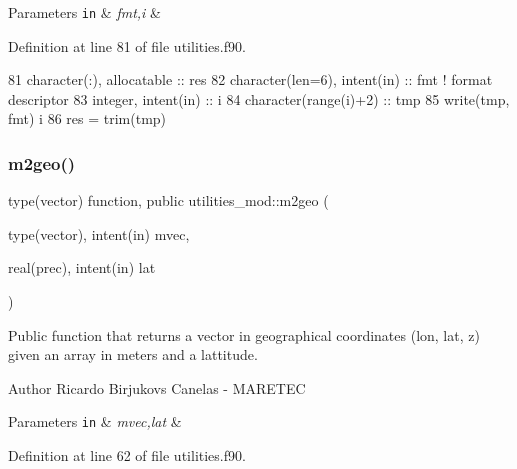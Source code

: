 \begin{DoxyParams}[1]{Parameters}
\mbox{\tt in}  & {\em fmt,i} & \\
\hline
\end{DoxyParams}


Definition at line 81 of file utilities.\+f90.


\begin{DoxyCode}
81     \textcolor{keywordtype}{character(:)}, \textcolor{keywordtype}{allocatable} :: res
82     \textcolor{keywordtype}{character(len=6)}, \textcolor{keywordtype}{intent(in)} :: fmt \textcolor{comment}{! format descriptor}
83     \textcolor{keywordtype}{integer}, \textcolor{keywordtype}{intent(in)} :: i
84     \textcolor{keywordtype}{character(range(i)+2)} :: tmp
85     \textcolor{keyword}{write}(tmp, fmt) i
86     res = trim(tmp)
\end{DoxyCode}
\mbox{\label{namespaceutilities__mod_ac4f9ec7e3dc3683a4e79e462d89a90b9}} 
\subsubsection{\texorpdfstring{m2geo()}{m2geo()}}
{\footnotesize\ttfamily type(vector) function, public utilities\+\_\+mod\+::m2geo (\begin{DoxyParamCaption}\item[{type(vector), intent(in)}]{mvec,  }\item[{real(prec), intent(in)}]{lat }\end{DoxyParamCaption})}



Public function that returns a vector in geographical coordinates (lon, lat, z) given an array in meters and a lattitude. 

\begin{DoxyAuthor}{Author}
Ricardo Birjukovs Canelas -\/ M\+A\+R\+E\+T\+EC 
\end{DoxyAuthor}

\begin{DoxyParams}[1]{Parameters}
\mbox{\tt in}  & {\em mvec,lat} & \\
\hline
\end{DoxyParams}


Definition at line 62 of file utilities.\+f90.


